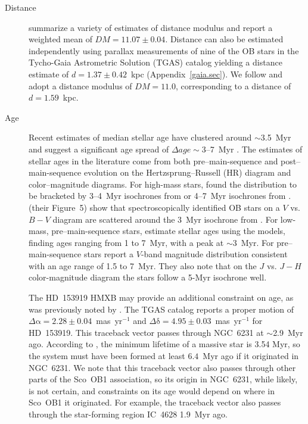\documentclass[twocolumn,tighten]{aastex61}
\begin{document}
\begin{description}
\item[Distance] \citet{2006A&A...454.1047S} summarize a variety of estimates of distance modulus and report a weighted mean of $DM=11.07\pm0.04$. Distance can also be estimated independently using parallax measurements of nine of the OB stars in the Tycho-Gaia Astrometric Solution (TGAS) catalog \citep{2016arXiv160904172G} yielding a distance estimate of $d=1.37\pm0.42$~kpc (Appendix~\ref{gaia.sec}). We follow  and adopt a distance modulus of $DM=11.0$, corresponding to a distance of $d=1.59$~kpc. 

\item[Age] Recent estimates of median stellar age have clustered around $\sim$3.5~Myr and suggest a significant age spread of $\Delta age\sim3$--7~Myr \citep{2007MNRAS.377..945S,2013AJ....145...37S, 2016arXiv160708860D}. 
The estimates of stellar ages in the literature come from both pre--main-sequence and post--main-sequence evolution on the Hertzsprung--Russell (HR) diagram and color--magnitude diagrams. For high-mass stars, \citet{2013AJ....145...37S} found the distribution to be bracketed by 3--4~Myr isochrones from \citet{2011A&A...530A.115B} or 4--7~Myr isochrones from \citet{2012A&A...537A.146E}.  (their Figure~5) show that spectroscopically identified OB stars on a $V$ vs.\ $B-V$ diagram are scattered around the 3~Myr isochrone from \citet{2012A&A...537A.146E}. 
For low-mass, pre--main-sequence stars, \citet{2013AJ....145...37S} estimate stellar ages using the \citet{2000A&A...358..593S} models, finding ages ranging from 1 to 7~Myr, with a peak at $\sim$3~Myr. For pre--main-sequence stars  report a $V$-band magnitude distribution consistent with an age range of 1.5 to 7~Myr. They also note that on the $J$ vs. $J-H$ color-magnitude diagram the stars follow a 5-Myr isochrone well. 

The HD~153919 HMXB may provide an additional constraint on age, as was previously noted by \citet{2001A&A...370..170A}. The TGAS catalog reports a proper motion of $\Delta\mathrm{\alpha}=2.28\pm0.04$~mas~yr$^{-1}$ and $\Delta\mathrm{\delta}=4.95\pm0.03$~mas~yr$^{-1}$ for HD~153919.  This traceback vector passes through NGC~6231 at $\sim$2.9~Myr ago. 
According to \citet{2012A&A...537A.146E}, the minimum lifetime of a massive star is 3.54 Myr, so the system must have been formed at least $6.4$~Myr ago if it originated in NGC~6231. We note that this traceback vector also passes through other parts of the Sco~OB1 association, so its origin in NGC~6231, while likely, is not certain, and constraints on its age would depend on where in Sco~OB1 it originated. For example, the traceback vector also passes through the star-forming region IC~4628 1.9~Myr ago. 


\end{description}
\end{document}

